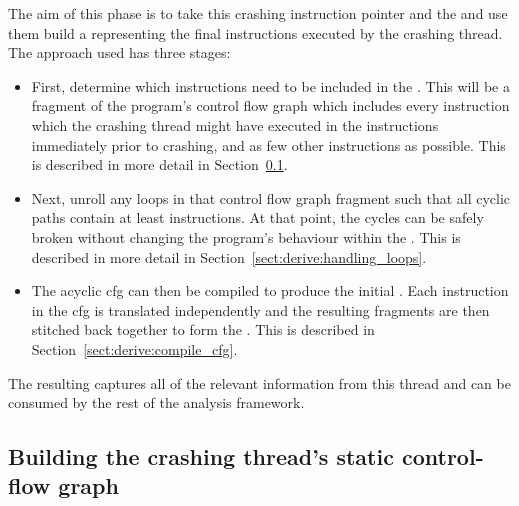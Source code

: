The aim of this phase is to take this crashing instruction pointer and
the  and use them build a {\StateMachine}
representing the final \backref{$\alpha$} instructions executed by the
crashing thread.  The approach used has three stages:

\begin{itemize}
\item First, determine which instructions need to be included in the
  {\StateMachine}.  This will be a fragment of the program's control
  flow graph which includes every instruction which the crashing
  thread might have executed in the \backref{$\alpha$} instructions
  immediately prior to crashing, and as few other instructions as
  possible.  This is described in more detail in
  Section~\ref{sect:derive:build_static_cfg}.
\item Next, unroll any loops in that control flow graph fragment such
  that all cyclic paths contain at least \backref{$\alpha$}
  instructions.  At that point, the cycles can be safely broken
  without changing the program's behaviour within the
  .  This is described in more detail in
  Section~\ref{sect:derive:handling_loops}.
\item The acyclic \gls{cfg} can then be compiled to produce the
  initial {\StateMachine}.  Each instruction in the \gls{cfg} is
  translated independently and the resulting fragments are then
  stitched back together to form the {\StateMachine}.  This is
  described in Section~\ref{sect:derive:compile_cfg}.
\end{itemize}

The resulting {\StateMachine} captures all of the relevant information
from this thread and can be consumed by the rest of the analysis
framework.

\subsection{Building the crashing thread's static control-flow graph}
\label{sect:derive:build_static_cfg}

